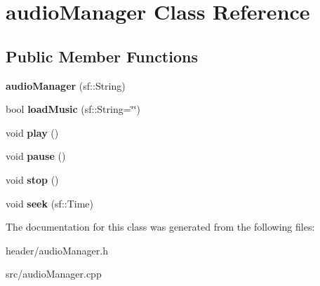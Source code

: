 \hypertarget{classaudioManager}{}\section{audio\+Manager Class Reference}
\label{classaudioManager}
\subsection*{Public Member Functions}
\begin{DoxyCompactItemize}
\item 
{\bfseries audio\+Manager} (sf\+::\+String)\hypertarget{classaudioManager_a6beca9bae38533550aa2fd756f5ccb65}{}\label{classaudioManager_a6beca9bae38533550aa2fd756f5ccb65}

\item 
bool {\bfseries load\+Music} (sf\+::\+String=\char`\"{}\char`\"{})\hypertarget{classaudioManager_ada6c910430c0c1e7467ad8c6641010f7}{}\label{classaudioManager_ada6c910430c0c1e7467ad8c6641010f7}

\item 
void {\bfseries play} ()\hypertarget{classaudioManager_aa81e9bae4581eb3a4e745635f7245927}{}\label{classaudioManager_aa81e9bae4581eb3a4e745635f7245927}

\item 
void {\bfseries pause} ()\hypertarget{classaudioManager_a915f6accefbcd9ee687b9aa913b5be5f}{}\label{classaudioManager_a915f6accefbcd9ee687b9aa913b5be5f}

\item 
void {\bfseries stop} ()\hypertarget{classaudioManager_a24d4746810b66c3c5db3d041ce37ab36}{}\label{classaudioManager_a24d4746810b66c3c5db3d041ce37ab36}

\item 
void {\bfseries seek} (sf\+::\+Time)\hypertarget{classaudioManager_ae25f98a4737421d17abb94162495faf0}{}\label{classaudioManager_ae25f98a4737421d17abb94162495faf0}

\end{DoxyCompactItemize}


The documentation for this class was generated from the following files\+:\begin{DoxyCompactItemize}
\item 
header/audio\+Manager.\+h\item 
src/audio\+Manager.\+cpp\end{DoxyCompactItemize}
